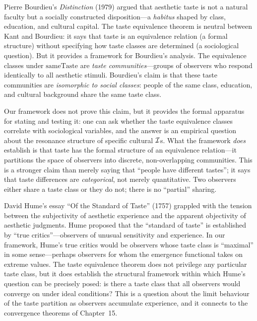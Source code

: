 \begin{interpretation}
\label{interp:bourdieu-taste}
Pierre Bourdieu's \textit{Distinction} (1979) argued that aesthetic taste is not a natural faculty but a socially constructed disposition---a \emph{habitus} shaped by class, education, and cultural capital.  The taste equivalence theorem is neutral between Kant and Bourdieu: it says that taste is an equivalence relation (a formal structure) without specifying how taste classes are determined (a sociological question).  But it provides a framework for Bourdieu's analysis.  The equivalence classes under $\mathrm{sameTaste}$ are \emph{taste communities}---groups of observers who respond identically to all aesthetic stimuli.  Bourdieu's claim is that these taste communities are \emph{isomorphic to social classes}: people of the same class, education, and cultural background share the same taste class.

Our framework does not prove this claim, but it provides the formal apparatus for stating and testing it: one can ask whether the taste equivalence classes correlate with sociological variables, and the answer is an empirical question about the resonance structure of specific cultural $\mathcal{I}$s.  What the framework \emph{does} establish is that taste has the formal structure of an equivalence relation---it partitions the space of observers into discrete, non-overlapping communities.  This is a stronger claim than merely saying that ``people have different tastes''; it says that taste differences are \emph{categorical}, not merely quantitative.  Two observers either share a taste class or they do not; there is no ``partial'' sharing.
\end{interpretation}

\begin{remark}
David Hume's essay ``Of the Standard of Taste'' (1757) grappled with the tension between the subjectivity of aesthetic experience and the apparent objectivity of aesthetic judgments.  Hume proposed that the ``standard of taste'' is established by ``true critics''---observers of unusual sensitivity and experience.  In our framework, Hume's true critics would be observers whose taste class is ``maximal'' in some sense---perhaps observers for whom the emergence functional takes on extreme values.  The taste equivalence theorem does not privilege any particular taste class, but it does establish the structural framework within which Hume's question can be precisely posed: is there a taste class that all observers would converge on under ideal conditions?  This is a question about the limit behaviour of the taste partition as observers accumulate experience, and it connects to the convergence theorems of Chapter~15.
\end{remark}

